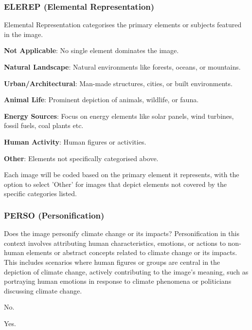 \subsubsection*{ELEREP (Elemental Representation)}
\label{subsubsec:elemental-representation}
Elemental Representation categorises the primary elements or subjects featured in the image.
\begin{description}[leftmargin=2.5cm, style=multiline, labelwidth=1.5cm]
\item[0] \textbf{Not Applicable}: No single element dominates the image.
\item[1] \textbf{Natural Landscape}: Natural environments like forests, oceans, or mountains.
\item[2] \textbf{Urban/Architectural}: Man-made structures, cities, or built environments.
\item[3] \textbf{Animal Life}: Prominent depiction of animals, wildlife, or fauna.
\item[4] \textbf{Energy Sources}: Focus on energy elements like solar panels, wind turbines, fossil fuels, coal plants etc.
\item[5] \textbf{Human Activity}: Human figures or activities.
\item[6] \textbf{Other}: Elements not specifically categorised above.
\end{description}

Each image will be coded based on the primary element it represents, with the option to select 'Other' for images that depict elements not covered by the specific categories listed.

\subsubsection*{PERSO (Personification)}
\label{subsubsec:personification}
Does the image personify climate change or its impacts? Personification in this context involves attributing human characteristics, emotions, or actions to non-human elements or abstract concepts related to climate change or its impacts. This includes scenarios where human figures or groups are central in the depiction of climate change, actively contributing to the image's meaning, such as portraying human emotions in response to climate phenomena or politicians discussing climate change.

\begin{description}[leftmargin=2.5cm, style=multiline, labelwidth=1.5cm]
\item[0] No.
\item[1] Yes.
\end{description}


